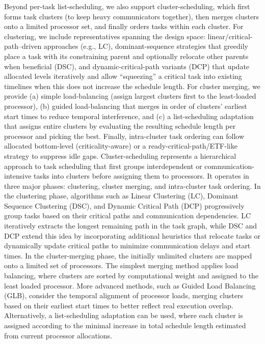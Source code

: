 Beyond per-task list-scheduling, we also support cluster-scheduling, which first forms task clusters (to keep heavy communicators together), then merges clusters onto a limited processor set, and finally orders tasks within each cluster. For clustering, we include representatives spanning the design space: linear/critical-path–driven approaches (e.g., LC), dominant-sequence strategies that greedily place a task with its constraining parent and optionally relocate other parents when beneficial (DSC), and dynamic-critical-path variants (DCP) that update allocated levels iteratively and allow “squeezing” a critical task into existing timelines when this does not increase the schedule length. For cluster merging, we provide (a) simple load-balancing (assign largest clusters first to the least-loaded processor), (b) guided load-balancing that merges in order of clusters’ earliest start times to reduce temporal interference, and (c) a list-scheduling adaptation that assigns entire clusters by evaluating the resulting schedule length per processor and picking the best. Finally, intra-cluster task ordering can follow allocated bottom-level (criticality-aware) or a ready-critical-path/ETF-like strategy to suppress idle gaps.
Cluster-scheduling represents a hierarchical approach to task scheduling that first groups interdependent or communication-intensive tasks into clusters before assigning them to processors. It operates in three major phases: clustering, cluster merging, and intra-cluster task ordering. In the clustering phase, algorithms such as Linear Clustering (LC), Dominant Sequence Clustering (DSC), and Dynamic Critical Path (DCP) progressively group tasks based on their critical paths and communication dependencies. LC iteratively extracts the longest remaining path in the task graph, while DSC and DCP extend this idea by incorporating additional heuristics that relocate tasks or dynamically update critical paths to minimize communication delays and start times.
In the cluster-merging phase, the initially unlimited clusters are mapped onto a limited set of processors. The simplest merging method applies load balancing, where clusters are sorted by computational weight and assigned to the least loaded processor. More advanced methods, such as Guided Load Balancing (GLB), consider the temporal alignment of processor loads, merging clusters based on their earliest start times to better reflect real execution overlap. Alternatively, a list-scheduling adaptation can be used, where each cluster is assigned according to the minimal increase in total schedule length estimated from current processor allocations.
